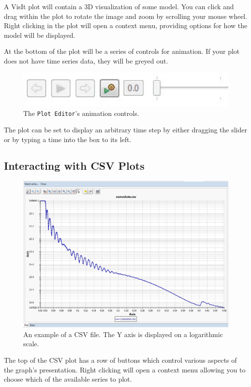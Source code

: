 A VisIt plot will contain a 3D visualization of some model. You can click and
drag within the plot to rotate the image and zoom by scrolling your mouse wheel.
Right clicking in the plot will open a context menu, providing options for how
the model will be displayed.

At the bottom of the plot will be a series of controls for animation. If your
plot does not have time series data, they will be greyed out. 

\begin{figure}[!h]
\includegraphics[width=12cm]{images/TimeSliderWidget} 
\centering
\caption{The \texttt{Plot Editor}'s animation controls.}
\label{fig:timesliderwidget}
\end{figure}

The plot can be set to display an arbitrary time step by either dragging the
slider or by typing a time into the box to its left.

\subsection{Interacting with CSV Plots}

\begin{figure}[!h]
\includegraphics[width=12cm]{images/CSVGraph}
\centering
\caption{An example of a CSV file. The Y axis is displayed on a logarithmic
scale.}
\label{fig:CSVGraph}
\end{figure}

The top of the CSV plot has a row of buttons which control various aspects of
the graph's presentation. Right clicking will open a context menu allowing you
to choose which of the available series to plot.

